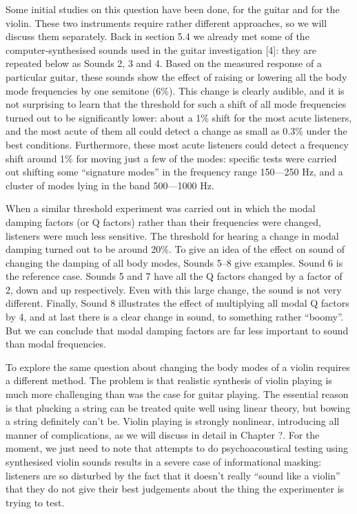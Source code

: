   Some initial studies on this question have been done, for the guitar and for 
  the violin. These two instruments require rather different approaches, so we 
  will discuss them separately. Back in section 5.4 we already met some of the 
  computer-synthesised sounds used in the guitar investigation [4]: they are 
  repeated below as Sounds 2, 3 and 4. Based on the measured response of a 
  particular guitar, these sounds show the effect of raising or lowering all 
  the body mode frequencies by one semitone (6\%). This change is clearly 
  audible, and it is not surprising to learn that the threshold for such a 
  shift of all mode frequencies turned out to be significantly lower: about a 
  1\% shift for the most acute listeners, and the most acute of them all could 
  detect a change as small as 0.3\% under the best conditions. Furthermore, 
  these most acute listeners could detect a frequency shift around 1\% for 
  moving just a few of the modes: specific tests were carried out shifting some 
  “signature modes” in the frequency range 150—250 Hz, and a cluster of modes 
  lying in the band 500—1000 Hz. 

\audio{}

\audio{}

\audio{}

  When a similar threshold experiment was carried out in which the modal 
  damping factors (or Q factors) rather than their frequencies were changed, 
  listeners were much less sensitive. The threshold for hearing a change in 
  modal damping turned out to be around 20\%. To give an idea of the effect on 
  sound of changing the damping of all body modes, Sounds 5--8 give examples. 
  Sound 6 is the reference case. Sounds 5 and 7 have all the Q factors changed 
  by a factor of 2, down and up respectively. Even with this large change, the 
  sound is not very different. Finally, Sound 8 illustrates the effect of 
  multiplying all modal Q factors by 4, and at last there is a clear change in 
  sound, to something rather ``boomy''. But we can conclude that modal damping 
  factors are far less important to sound than modal frequencies. 

\audio{}

\audio{}

\audio{}

\audio{}

  To explore the same question about changing the body modes of a violin 
  requires a different method. The problem is that realistic synthesis of 
  violin playing is much more challenging than was the case for guitar playing. 
  The essential reason is that plucking a string can be treated quite well 
  using linear theory, but bowing a string definitely can’t be. Violin playing 
  is strongly nonlinear, introducing all manner of complications, as we will 
  discuss in detail in Chapter ?. For the moment, we just need to note that 
  attempts to do psychoacoustical testing using synthesised violin sounds 
  results in a severe case of informational masking: listeners are so disturbed 
  by the fact that it doesn’t really “sound like a violin” that they do not 
  give their best judgements about the thing the experimenter is trying to 
  test. 

